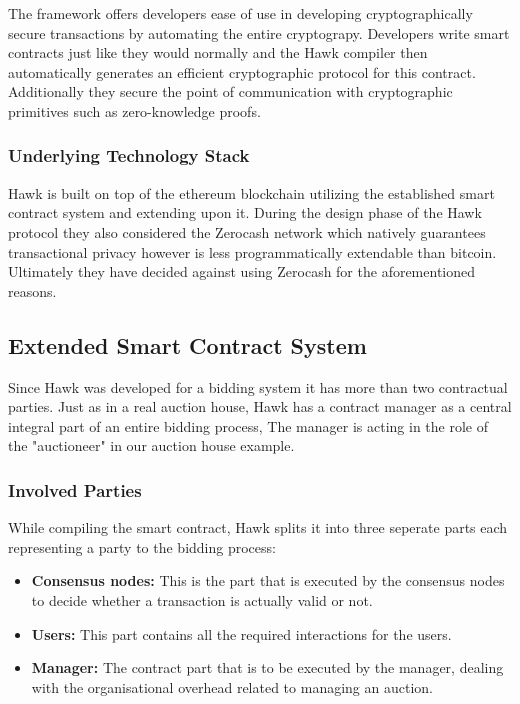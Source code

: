 The framework offers developers ease of use in developing cryptographically secure transactions by automating the entire cryptograpy. Developers write smart contracts just like they would normally and the Hawk compiler then automatically generates an efficient cryptographic protocol for this contract. Additionally they secure the point of communication with cryptographic primitives such as zero-knowledge proofs.

\subsubsection{Underlying Technology Stack}
Hawk is built on top of the ethereum blockchain utilizing the established smart contract system and extending upon it. During the design phase of the Hawk protocol they also considered the Zerocash network which natively guarantees transactional privacy however is less programmatically extendable than bitcoin. Ultimately they have decided against using Zerocash for the aforementioned reasons.

\subsection{Extended Smart Contract System}
Since Hawk was developed for a bidding system it has more than two contractual parties. Just as in a real auction house, Hawk has a contract manager as a central integral part of an entire bidding process, The manager is acting in the role of the "auctioneer" in our auction house example. 

\subsubsection{Involved Parties}
While compiling the smart contract, Hawk splits it into three seperate parts each representing a party to the bidding process:
\begin{itemize}
\item \textbf{Consensus nodes:}
This is the part that is executed by the consensus nodes to decide whether a transaction is actually valid or not.
\item \textbf{Users:}
This part contains all the required interactions for the users.
\item \textbf{Manager:}
The contract part that is to be executed by the manager, dealing with the organisational overhead related to managing an auction.
\end{itemize}

